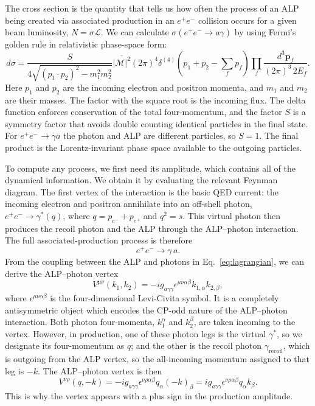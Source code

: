\documentclass[12pt,a4paper]{article}
\begin{document}
The cross section is the quantity that tells us how often the process of an
ALP being created via associated production in an $e^+e^-$ collision occurs
for a given beam luminosity, $N=\sigma\mathcal{L}$. We can calculate
$\sigma(e^+e^-\to a\gamma)$ by using Fermi's golden rule in relativistic
phase-space form:
\begin{equation}
    d\sigma
    =
    \frac{S}{4\sqrt{(p_1\cdot p_2)^2-m_1^2m_2^2}}
    \overline{|\mathcal{M}|^2}
    (2\pi)^4
    \delta^{(4)}
    \!\left(p_1+p_2-\sum_f p_f\right)
    \prod_f
    \frac{d^3\mathbf{p}_f}{(2\pi)^3\,2E_f}.
    \label{eq:scattering-fermi}
\end{equation}
Here $p_1$ and $p_2$ are the incoming electron and positron momenta, and $m_1$
and $m_2$ are their masses. The factor with the square root is the incoming
flux. The delta function enforces conservation of the total four-momentum, and
the factor $S$ is a symmetry factor that avoids double counting identical
particles in the final state. For $e^+e^-\to\gamma a$ the photon and ALP are
different particles, so $S=1$. The final product is the Lorentz-invariant
phase space available to the outgoing particles.

To compute any process, we first need its amplitude, which contains all of the
dynamical information. We obtain it by evaluating the relevant Feynman diagram.
The first vertex of the interaction is the basic QED current: the incoming
electron and positron annihilate into an off-shell photon,
$e^+e^-\to\gamma^\ast(q)$, where $q=p_{e^-}+p_{e^+}$ and $q^2=s$. This virtual
photon then produces the recoil photon and the ALP through the ALP--photon
interaction. The full associated-production process is therefore
\begin{equation}
    e^+ e^- \to \gamma\,a.
    \label{eq:production}
\end{equation}
From the coupling between the ALP and photons in Eq.~\eqref{eq:lagrangian}, we
can derive the ALP--photon vertex
\begin{equation}
    V^{\mu\nu}(k_1,k_2)
    =
    -ig_{a\gamma\gamma}\epsilon^{\mu\nu\alpha\beta}k_{1,\alpha}k_{2,\beta},
    \label{eq:vertex}
\end{equation}
where $\epsilon^{\mu\nu\alpha\beta}$ is the four-dimensional Levi-Civita
symbol. It is a completely antisymmetric object which encodes the CP-odd
nature of the ALP--photon interaction. Both photon four-momenta,
$k_1^\alpha$ and $k_2^\beta$, are taken incoming to the vertex. However, in
production, one of these photon legs is the virtual $\gamma^\ast$, so we
designate its four-momentum as $q$; and the other is the recoil photon
$\gamma_\mathrm{recoil}$, which is outgoing from the ALP vertex, so the
all-incoming momentum assigned to that leg is $-k$. The ALP--photon vertex is
then
\begin{equation}
    V^{\nu\rho}(q,-k)
    =
    -ig_{a\gamma\gamma}\epsilon^{\nu\rho\alpha\beta}q_\alpha(-k)_\beta
    =
    ig_{a\gamma\gamma}\epsilon^{\nu\rho\alpha\beta}q_\alpha k_\beta.
    \label{eq:production-vertex}
\end{equation}
This is why the vertex appears with a plus sign in the production amplitude.
\end{document}

